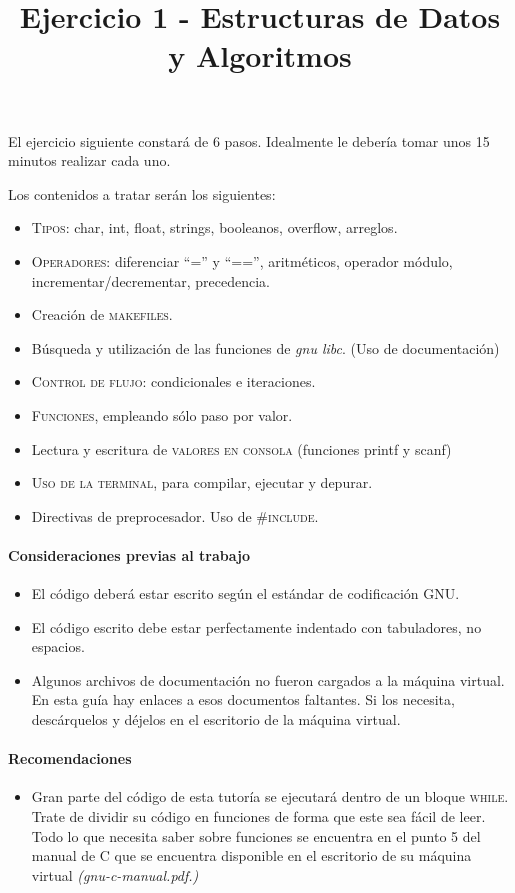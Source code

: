 \documentclass[letterpaper,10pt]{article}
\title{Ejercicio 1 - Estructuras de Datos y Algoritmos}
\author{}
\begin{document}
\maketitle

El ejercicio siguiente constará de 6 pasos. Idealmente le debería tomar unos 15
minutos realizar cada uno.

Los contenidos a tratar serán los siguientes:
\begin{itemize}
 \item \textsc{Tipos:} char, int, float, strings, booleanos, overflow, arreglos.
 \item \textsc{Operadores:} diferenciar ``='' y ``=='', aritméticos, operador módulo, incrementar/decrementar, precedencia.
 \item Creación de \textsc{makefiles}.
 \item Búsqueda y utilización de las funciones de \textit{gnu libc}. (Uso de documentación)
 \item \textsc{Control de flujo:} condicionales e iteraciones.
 \item \textsc{Funciones}, empleando sólo paso por valor.
 \item Lectura y escritura de \textsc{valores en consola} (funciones printf y scanf)
 \item \textsc{Uso de la terminal}, para compilar, ejecutar y depurar.
 \item Directivas de preprocesador. Uso de \textsc{\#include}.
\end{itemize}

\paragraph{Consideraciones previas al trabajo}
\begin{itemize}
 \item El código deberá estar escrito según el estándar de codificación GNU.
 \item El código escrito debe estar perfectamente indentado con tabuladores, no espacios.
 \item Algunos archivos de documentación no fueron cargados a la máquina virtual.
       En esta guía hay enlaces a esos documentos faltantes. Si los necesita, descárquelos y déjelos en el escritorio de la máquina virtual.
\end{itemize}

\paragraph{Recomendaciones}
\begin{itemize}
 \item Gran parte del código de esta tutoría se ejecutará dentro de un bloque
  \textsc{while}. Trate de dividir su código en funciones de forma que este sea fácil de leer. Todo lo que necesita saber sobre funciones se encuentra en el punto 5 del manual de C que se encuentra disponible en el escritorio de su máquina virtual \textit{(gnu-c-manual.pdf.)}
\end{itemize}
\end{document}
